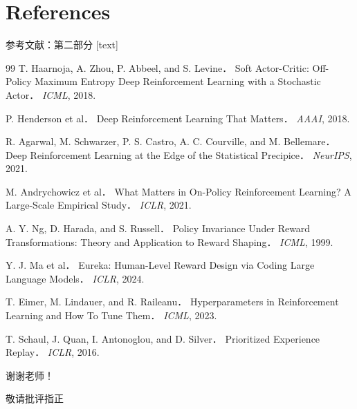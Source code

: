 \documentclass[10pt,aspectratio=169,mathserif]{beamer}
\begin{document}
\section{References}

\begin{frame}[allowframebreaks]{参考文献：第二部分}
\footnotesize
{}[text]
\begin{thebibliography}{99}
T. Haarnoja, A. Zhou, P. Abbeel, and S. Levine．
\newblock Soft Actor-Critic: Off-Policy Maximum Entropy Deep Reinforcement Learning with a Stochastic Actor．
\newblock \emph{ICML}, 2018.

P. Henderson et al．
\newblock Deep Reinforcement Learning That Matters．
\newblock \emph{AAAI}, 2018.

R. Agarwal, M. Schwarzer, P. S. Castro, A. C. Courville, and M. Bellemare．
\newblock Deep Reinforcement Learning at the Edge of the Statistical Precipice．
\newblock \emph{NeurIPS}, 2021.

M. Andrychowicz et al．
\newblock What Matters in On-Policy Reinforcement Learning? A Large-Scale Empirical Study．
\newblock \emph{ICLR}, 2021.

A. Y. Ng, D. Harada, and S. Russell．
\newblock Policy Invariance Under Reward Transformations: Theory and Application to Reward Shaping．
\newblock \emph{ICML}, 1999.

Y. J. Ma et al．
\newblock Eureka: Human-Level Reward Design via Coding Large Language Models．
\newblock \emph{ICLR}, 2024.

T. Eimer, M. Lindauer, and R. Raileanu．
\newblock Hyperparameters in Reinforcement Learning and How To Tune Them．
\newblock \emph{ICML}, 2023.

T. Schaul, J. Quan, I. Antonoglou, and D. Silver．
\newblock Prioritized Experience Replay．
\newblock \emph{ICLR}, 2016.
\end{thebibliography}
\end{frame}

\begin{frame}
\centering
\vspace{1.1cm}
\Huge 谢谢老师！
\vspace{0.8cm}

\normalsize 敬请批评指正
\end{frame}
\end{document}
